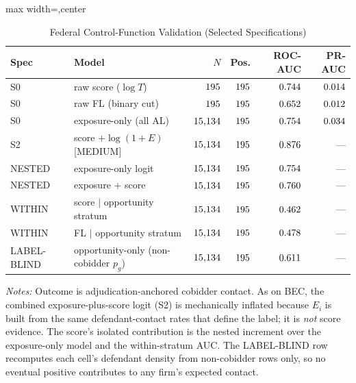\begin{table}[htbp]
\centering
\caption{Federal Control-Function Validation (Selected Specifications)}
\label{supp:tab_federal_control_function}
\scriptsize
\begin{adjustbox}{max width=\textwidth,center}
\begin{threeparttable}
\begin{tabular}{lp{4.0cm}rrrr}
\toprule
Spec & Model & $N$ & Pos. & ROC-AUC & PR-AUC \\
\midrule
S0 & raw score ($\log T$) & $195$ & $195$ & $0.744$ & $0.014$ \\
S0 & raw FL (binary cut) & $195$ & $195$ & $0.652$ & $0.012$ \\
S0 & exposure-only (all AL) & $15{,}134$ & $195$ & $0.754$ & $0.034$ \\
S2 & score $+\log(1{+}E)$ [MEDIUM] & $15{,}134$ & $195$ & $0.876$ & --- \\
NESTED & exposure-only logit & $15{,}134$ & $195$ & $0.754$ & --- \\
NESTED & exposure $+$ score & $15{,}134$ & $195$ & $0.760$ & --- \\
WITHIN & score $\mid$ opportunity stratum & $15{,}134$ & $195$ & $0.462$ & --- \\
WITHIN & FL $\mid$ opportunity stratum & $15{,}134$ & $195$ & $0.478$ & --- \\
LABEL-BLIND & opportunity-only (non-cobidder $p_g$) & $15{,}134$ & $195$ & $0.611$ & --- \\
\bottomrule
\end{tabular}
\begin{tablenotes}
\scriptsize
\item \textit{Notes:} Outcome is adjudication-anchored cobidder contact.
As on BEC, the combined exposure-plus-score logit (S2) is mechanically
inflated because $E_i$ is built from the same defendant-contact rates that
define the label; it is \emph{not} score evidence. The score's isolated
contribution is the nested increment over the exposure-only model and the
within-stratum AUC. The LABEL-BLIND row recomputes each cell's defendant
density from non-cobidder rows only, so no eventual positive contributes to
any firm's expected contact.
\end{tablenotes}
\end{threeparttable}
\end{adjustbox}
\end{table}


